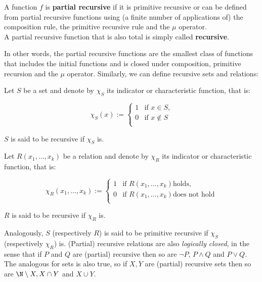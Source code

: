\documentclass[../main.tex]{memoir}
\begin{document}
\begin{definition}
  A function $f$ is \textbf{partial recursive} if it is primitive recursive or can be defined from partial recursive functions using (a finite number of applications of) the composition rule, the primitive recursive rule and the $\mu$ operator. \\
  A partial recursive function that is also total is simply called \textbf{recursive}.
\end{definition}

In other words, the partial recursive functions are the smallest class of functions that includes the initial functions and is closed under composition, primitive recursion and the $\mu$ operator. Similarly, we can define recursive sets and relations:

\begin{definition}
  Let $S$ be a set and denote by $\chi_S$ its indicator or characteristic function, that is:

  \begin{equation*}
    \chi_S(x) := \left\{
    \begin{array}{lr}
      1 & \text{if } x \in S \text{,} \\
      0 & \text{if } x \not\in S \\
    \end{array}\right.
  \end{equation*}

  $S$ is said to be recursive if $\chi_S$ is.
\end{definition}

\begin{definition}
  Let $R(x_1, \ldots, x_k)$ be a relation and denote by $\chi_R$ its indicator or characteristic function, that is:

  \begin{equation*}
    \chi_R(x_1, \ldots, x_k) := \left\{
    \begin{array}{lr}
      1 & \text{if } R(x_1, \ldots, x_k) \text{holds,} \\
      0 & \text{if } R(x_1, \ldots, x_k) \text{does not hold} \\
    \end{array}\right.
  \end{equation*}

  $R$ is said to be recursive if $\chi_R$ is.
\end{definition}

Analogously, $S$ (respectively $R$) is said to be primitive recursive if $\chi_S$ (respectively $\chi_R$) is. (Partial) recursive relations are also \textit{logically closed}, in the sense that if $P$ and $Q$ are (partial) recursive then so are $\neg P$, $P \land Q$ and $P \lor Q$. The analogous for sets is also true, so if $X, Y$ are (partial) recursive sets then so are $\N \setminus X, X \cap Y$ and $X \cup Y$.
\end{document}
